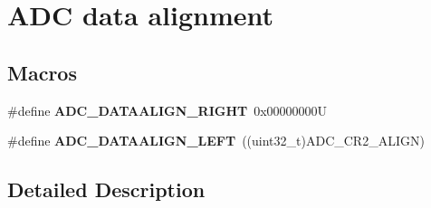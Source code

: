 \hypertarget{group___a_d_c___data__align}{}\section{A\+DC data alignment}
\label{group___a_d_c___data__align}
\subsection*{Macros}
\begin{DoxyCompactItemize}
\item 
\mbox{\label{group___a_d_c___data__align_gafed5c0d327ad6d2cc0960f7943beb265}} 
\#define {\bfseries A\+D\+C\+\_\+\+D\+A\+T\+A\+A\+L\+I\+G\+N\+\_\+\+R\+I\+G\+HT}~0x00000000U
\item 
\mbox{\label{group___a_d_c___data__align_ga8afeead661c1ffbc27a5405a254d60ba}} 
\#define {\bfseries A\+D\+C\+\_\+\+D\+A\+T\+A\+A\+L\+I\+G\+N\+\_\+\+L\+E\+FT}~((uint32\+\_\+t)A\+D\+C\+\_\+\+C\+R2\+\_\+\+A\+L\+I\+GN)
\end{DoxyCompactItemize}


\subsection{Detailed Description}
